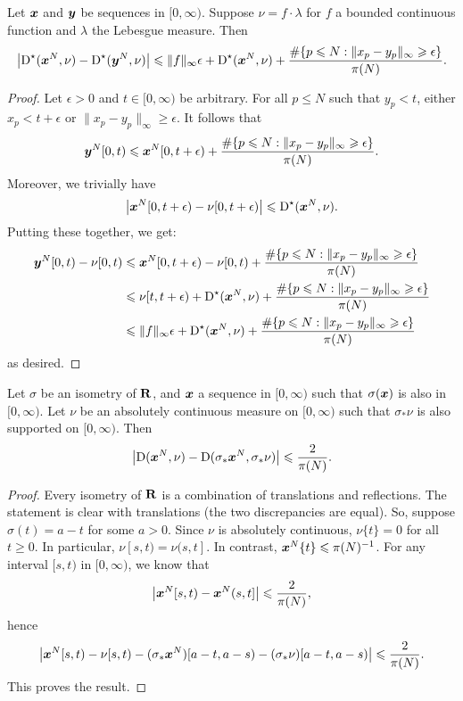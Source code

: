 \begin{lemma}
Let ${\boldsymbol x}$ and ${\boldsymbol y}$ be sequences in $[0,\infty)$. Suppose 
$\nu = f\cdot \lambda$ for $f$ a bounded continuous function and $\lambda$ the 
Lebesgue measure. Then 
\[
	\left|\operatorname{D}^\star({\boldsymbol x}^N, \nu) - \operatorname{D}^\star({\boldsymbol y}^N,\nu)\right| \leqslant \|f\|_\infty \epsilon + \operatorname{D}^\star({\boldsymbol x}^N,\nu) + \frac{\#\{ p\leqslant N : \|x_p - y_p\|_\infty \geqslant \epsilon\}}{\pi(N)} .
\]
\end{lemma}
\begin{proof}
Let $\epsilon>0$ and $t\in [0,\infty)$ be arbitrary. For all $p\leqslant N$ 
such that $y_p<t$, either $x_p < t+\epsilon$ or 
$\|x_p - y_p\|_\infty \geqslant \epsilon$. It follows that 
\[
	{\boldsymbol y}^N[0,t) \leqslant {\boldsymbol x}^N[0,t+\epsilon) + \frac{\#\{ p\leqslant N : \|x_p - y_p\|_\infty \geqslant \epsilon\}}{\pi(N)} .
\]
Moreover, we trivially have 
\[
	\left| {\boldsymbol x}^N[0,t+\epsilon) - \nu[0,t+\epsilon)\right| \leqslant \operatorname{D}^\star({\boldsymbol x}^N,\nu) .
\]
Putting these together, we get: 
\begin{align*}
	{\boldsymbol y}^N[0,t) - \nu[0,t) 
		&\leqslant {\boldsymbol x}^N[0,t+\epsilon) - \nu[0,t) + \frac{\#\{ p\leqslant N : \|x_p - y_p\|_\infty \geqslant \epsilon\}}{\pi(N)} \\
		&\leqslant \nu[t,t+\epsilon) + \operatorname{D}^\star({\boldsymbol x}^N,\nu) + \frac{\#\{ p\leqslant N : \|x_p - y_p\|_\infty \geqslant \epsilon\}}{\pi(N)} \\
		&\leqslant \|f\|_\infty \epsilon + \operatorname{D}^\star({\boldsymbol x}^N,\nu) + \frac{\#\{ p\leqslant N : \|x_p - y_p\|_\infty \geqslant \epsilon\}}{\pi(N)} 
\end{align*}
as desired. 
\end{proof}

\begin{lemma}
Let $\sigma$ be an isometry of $\mathbf{R}$, and ${\boldsymbol x}$ a sequence in $[0,\infty)$ 
such that $\sigma({\boldsymbol x})$ is also in $[0,\infty)$. Let $\nu$ be an absolutely 
continuous measure on $[0,\infty)$ such that $\sigma_\ast \nu$ is also 
supported on $[0,\infty)$. Then 
\[
	\left|\operatorname{D}({\boldsymbol x}^N, \nu) - \operatorname{D}(\sigma_\ast {\boldsymbol x}^N, \sigma_\ast \nu)\right| \leqslant \frac{2}{\pi(N)} .
\]
\end{lemma}
\begin{proof}
Every isometry of $\mathbf{R}$ is a combination of translations and reflections. 
The statement is clear with translations (the two discrepancies are equal). So, 
suppose $\sigma(t) = a - t$ for some $a>0$. Since $\nu$ is absolutely 
continuous, $\nu\{t\}=0$ for all $t\geqslant 0$. In particular, 
$\nu[s,t) = \nu(s,t]$. In contrast, ${\boldsymbol x}^N\{t\}\leqslant \pi(N)^{-1}$. For any 
interval $[s,t)$ in $[0,\infty)$, we know that 
\[
	\left| {\boldsymbol x}^N[s,t) - {\boldsymbol x}^N(s,t]\right| \leqslant \frac{2}{\pi(N)}  ,
\]
hence 
\[
	\left| {\boldsymbol x}^N[s,t) - \nu[s,t) - (\sigma_\ast {\boldsymbol x}^N)[a-t,a-s) - (\sigma_\ast \nu)[a-t,a-s)\right| \leqslant \frac{2}{\pi(N)} .
\]
This proves the result. 
\end{proof}






